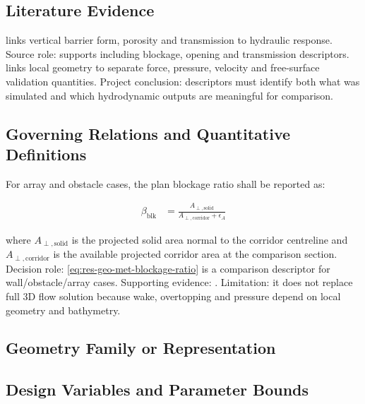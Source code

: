 
\subsection{Literature Evidence}
\label{sec:res-geo-met-literature-evidence}

\textcite{deljesus2012porous} links vertical barrier form, porosity
and transmission to hydraulic response. Source role: supports
including blockage, opening and transmission descriptors.
\textcite{watanabe2022validation} links local geometry to separate
force, pressure, velocity and free-surface validation quantities.
Project conclusion: descriptors must identify both what was simulated
and which hydrodynamic outputs are meaningful for comparison.

\subsection{Governing Relations and Quantitative Definitions}
\label{sec:res-geo-met-governing-relations}

For array and obstacle cases, the plan blockage ratio shall be
reported as:

\begin{align}
  \beta_{\mathrm{blk}}
  &=
  \frac{
    A_{\perp,\mathrm{solid}}
  }{
    A_{\perp,\mathrm{corridor}}
    +
    \epsilon_A
  }
  \label{eq:res-geo-met-blockage-ratio}
\end{align}

where $A_{\perp,\mathrm{solid}}$ is the projected solid area normal to
the corridor centreline and $A_{\perp,\mathrm{corridor}}$ is the
available projected corridor area at the comparison section. Decision
role: \cref{eq:res-geo-met-blockage-ratio} is a comparison descriptor
for wall/obstacle/array cases. Supporting evidence:
\textcite{deljesus2012porous}. Limitation: it does not replace full
3D flow solution because wake, overtopping and pressure depend on
local geometry and bathymetry.

\subsection{Geometry Family or Representation}
\label{sec:res-geo-met-geometry-family-representation}


\subsection{Design Variables and Parameter Bounds}
\label{sec:res-geo-met-design-variables-parameter-bounds}

